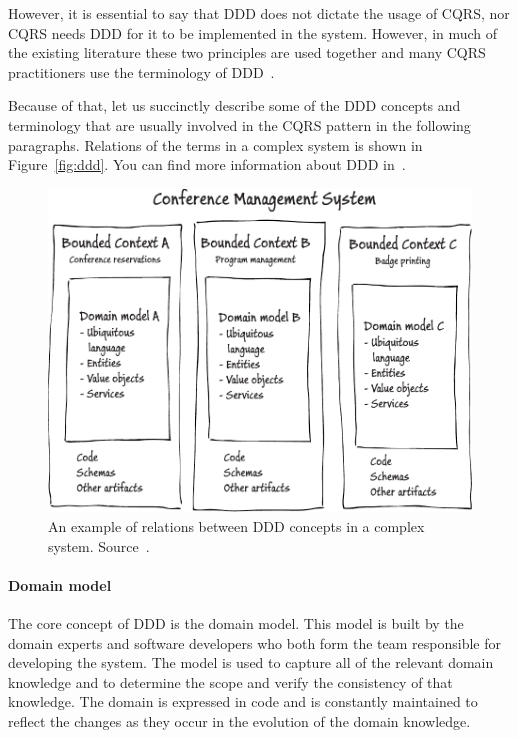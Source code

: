 \documentclass{book}
\begin{document}
However, it is essential to say that DDD does not dictate the usage of
CQRS, nor CQRS needs DDD for it to be implemented in the system.
However, in much of the existing literature these two principles are
used together and many CQRS practitioners use the terminology of DDD~\cite{journey}.

Because of that, let us succinctly describe some of the DDD concepts and
terminology that are usually involved in the CQRS pattern in the
following paragraphs. Relations of the terms in a complex system is
shown in Figure~\ref{fig:ddd}. You can find more information about DDD
in~\cite{ddd}.


\begin{figure}[h!]
\begin{center}
\includegraphics[width=1\columnwidth]{figures/ddd/ddd}
\caption[Relations between DDD concepts]{An example of relations between DDD concepts in a complex system. Source~\cite{journey}.%
}
\end{center}
\end{figure}

\paragraph{Domain model}\label{domain-model}

The core concept of DDD is the domain model. This model is built by the
domain experts and software developers who both form the team
responsible for developing the system. The model is used to capture all
of the relevant domain knowledge and to determine the scope and verify
the consistency of that knowledge. The domain is expressed in code and
is constantly maintained to reflect the changes as they occur in the
evolution of the domain knowledge.~\cite{journey}
\end{document}
